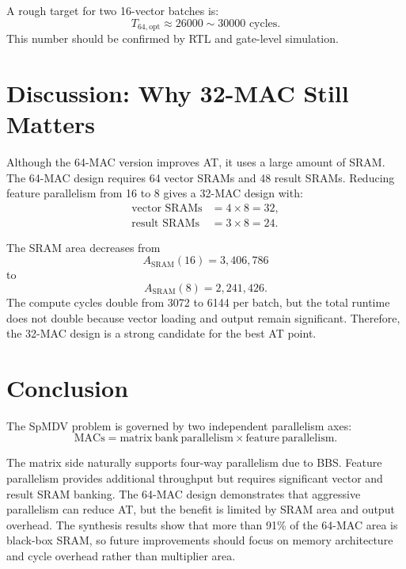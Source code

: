 \documentclass[11pt,a4paper]{article}
\begin{document}
A rough target for two 16-vector batches is:
\begin{equation}
    T_{64,\mathrm{opt}} \approx 26000 \sim 30000 \text{ cycles}.
\end{equation}
This number should be confirmed by RTL and gate-level simulation.

\section{Discussion: Why 32-MAC Still Matters}

Although the 64-MAC version improves AT, it uses a large amount of SRAM. The 64-MAC design requires 64 vector SRAMs and 48 result SRAMs. Reducing feature parallelism from 16 to 8 gives a 32-MAC design with:
\begin{align*}
    \text{vector SRAMs} &= 4 \times 8 = 32,\\
    \text{result SRAMs} &= 3 \times 8 = 24.
\end{align*}

The SRAM area decreases from
\begin{equation}
    A_{\mathrm{SRAM}}(16) = 3,406,786
\end{equation}
to
\begin{equation}
    A_{\mathrm{SRAM}}(8) = 2,241,426.
\end{equation}
The compute cycles double from 3072 to 6144 per batch, but the total runtime does not double because vector loading and output remain significant. Therefore, the 32-MAC design is a strong candidate for the best AT point.

\section{Conclusion}

The SpMDV problem is governed by two independent parallelism axes:
\begin{equation}
    \mathrm{MACs} = \mathrm{matrix\ bank\ parallelism} \times \mathrm{feature\ parallelism}.
\end{equation}

The matrix side naturally supports four-way parallelism due to BBS. Feature parallelism provides additional throughput but requires significant vector and result SRAM banking. The 64-MAC design demonstrates that aggressive parallelism can reduce AT, but the benefit is limited by SRAM area and output overhead. The synthesis results show that more than 91\% of the 64-MAC area is black-box SRAM, so future improvements should focus on memory architecture and cycle overhead rather than multiplier area.
\end{document}
